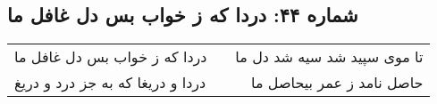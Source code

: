 \begin{center}
\section*{شماره ۴۴: دردا که ز خواب بس دل غافل ما}
\label{sec:044}
\begin{longtable}{l p{0.5cm} r}
دردا که ز خواب بس دل غافل ما
&&
تا موی سپید شد سیه شد دل ما
\\
دردا و دریغا که به جز درد و دریغ
&&
حاصل نامد ز عمر بیحاصل ما
\\
\end{longtable}
\end{center}

